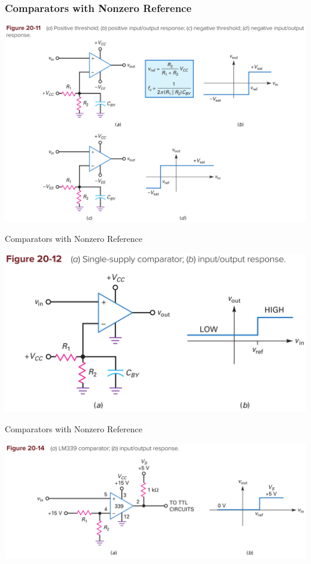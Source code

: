\documentclass[pdflatex,compress]{beamer}
\begin{document}
\begin{frame}
	\frametitle{Comparators with Nonzero Reference}
	\begin{center}
		\includegraphics[height=0.85\textheight]{img/2011}
	\end{center}
\end{frame}

\begin{frame}{Comparators with Nonzero Reference}
	\begin{center}
		\includegraphics[width=1\linewidth]{img/2012}
	\end{center}
\end{frame}

\begin{frame}{Comparators with Nonzero Reference}
	\begin{center}
		\includegraphics[width=1\linewidth]{img/2014}
	\end{center}
\end{frame}
\end{document}
